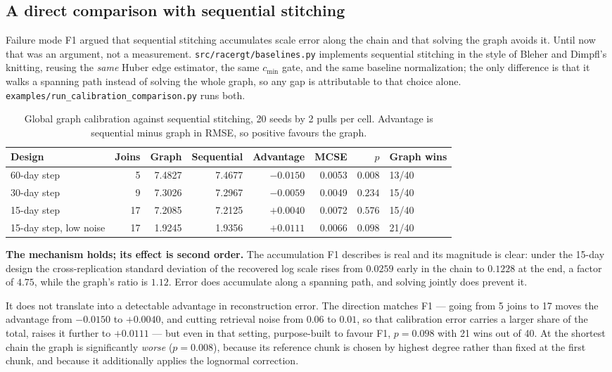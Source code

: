 \documentclass[12pt,a4paper,oneside]{article}
\begin{document}
\subsection{A direct comparison with sequential stitching}\label{sec:calexp}

Failure mode F1 argued that sequential stitching accumulates scale error along
the chain and that solving the graph avoids it. Until now that was an argument,
not a measurement. \texttt{src/racergt/baselines.py} implements sequential
stitching in the style of Bleher and Dimpfl's knitting, reusing the \emph{same}
Huber edge estimator, the same $c_{\min}$ gate, and the same baseline
normalization; the only difference is that it walks a spanning path instead of
solving the whole graph, so any gap is attributable to that choice alone.
\texttt{examples/run\_calibration\_comparison.py} runs both.

\begin{table}[H]
\centering
\small
\caption{Global graph calibration against sequential stitching, 20 seeds by 2
pulls per cell. Advantage is sequential minus graph in RMSE, so positive favours
the graph.}
\label{tab:calexp}
\begin{tabular}{lrrrrrrl}
\toprule
Design & Joins & Graph & Sequential & Advantage & MCSE & $p$ & Graph wins\\
\midrule
60-day step & 5 & 7.4827 & 7.4677 & $-0.0150$ & 0.0053 & $0.008$ & 13/40\\
30-day step & 9 & 7.3026 & 7.2967 & $-0.0059$ & 0.0049 & $0.234$ & 15/40\\
15-day step & 17 & 7.2085 & 7.2125 & $+0.0040$ & 0.0072 & $0.576$ & 15/40\\
15-day step, low noise & 17 & 1.9245 & 1.9356 & $+0.0111$ & 0.0066 & $0.098$ & 21/40\\
\bottomrule
\end{tabular}
\end{table}

\textbf{The mechanism holds; its effect is second order.} The accumulation F1
describes is real and its magnitude is clear: under the 15-day design the
cross-replication standard deviation of the recovered log scale rises from
$0.0259$ early in the chain to $0.1228$ at the end, a factor of $4.75$, while
the graph's ratio is $1.12$. Error does accumulate along a spanning path, and
solving jointly does prevent it.

It does not translate into a detectable advantage in reconstruction error. The
direction matches F1 --- going from 5 joins to 17 moves the advantage from
$-0.0150$ to $+0.0040$, and cutting retrieval noise from $0.06$ to $0.01$, so
that calibration error carries a larger share of the total, raises it further to
$+0.0111$ --- but even in that setting, purpose-built to favour F1, $p=0.098$ with
21 wins out of 40. At the shortest chain the graph is significantly \emph{worse}
($p=0.008$), because its reference chunk is chosen by highest degree rather than
fixed at the first chunk, and because it additionally applies the lognormal
correction.
\end{document}
